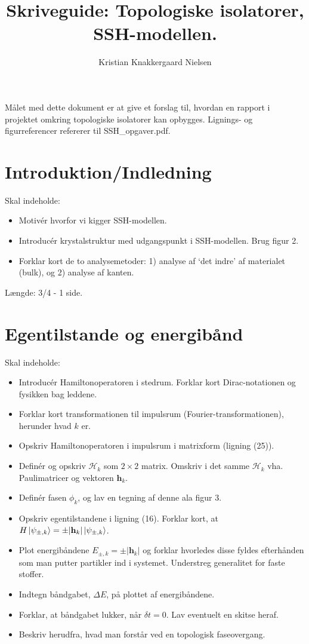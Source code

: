 \documentclass[10pt]{article}
\title{Skriveguide: Topologiske isolatorer, SSH-modellen.}
\author{Kristian Knakkergaard Nielsen}
\begin{document}
\maketitle
Målet med dette dokument er at give et forslag til, hvordan en rapport i projektet omkring topologiske isolatorer kan opbygges. Lignings- og figurreferencer refererer til SSH\_opgaver.pdf.

\section{Introduktion/Indledning}
Skal indeholde:
\begin{itemize}
\item Motivér hvorfor vi kigger SSH-modellen. 
\item Introducér krystalstruktur med udgangspunkt i SSH-modellen. Brug figur 2. 
\item Forklar kort de to analysemetoder: 1) analyse af `det indre' af materialet (bulk), og 2) analyse af kanten. 
\end{itemize}

Længde: 3/4 - 1 side. 

\section{Egentilstande og energibånd}
Skal indeholde:
\begin{itemize}
\item Introducér Hamiltonoperatoren i stedrum. Forklar kort Dirac-notationen og fysikken bag leddene. 
\item Forklar kort transformationen til impulsrum (Fourier-transformationen), herunder hvad $k$ er.
\item Opskriv Hamiltonoperatoren i impulsrum i matrixform (ligning (25)). 
\item Definér og opskriv $\mathcal{H}_k$ som $2\times 2$ matrix. Omskriv i det samme $\mathcal{H}_k$ vha. Paulimatricer og vektoren $\mathbf{h}_k$. 
\item Definér fasen $\phi_k$, og lav en tegning af denne ala figur 3. 
\item Opskriv egentilstandene i ligning (16). Forklar kort, at $H\ket{\psi_{\pm, k}} = \pm |\mathbf{h}_k|\ket{\psi_{\pm, k}}$. 
\item Plot energibåndene $E_{\pm, k} = \pm |\mathbf{h}_k|$ og forklar hvorledes disse fyldes efterhånden som man putter partikler ind i systemet. Understreg generalitet for faste stoffer.
\item Indtegn båndgabet, $\Delta E$, på plottet af energibåndene.  
\item Forklar, at båndgabet lukker, når $\delta t = 0$. Lav eventuelt en skitse heraf.
\item Beskriv herudfra, hvad man forstår ved en topologisk faseovergang. 
\end{itemize}
\end{document}
